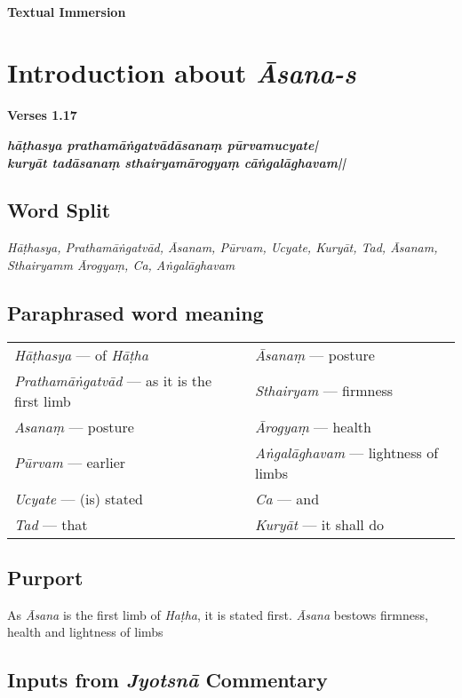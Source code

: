 \thispagestyle{empty}
~
\vfill
\begin{center}
\textbf{\Huge Textual Immersion}
\end{center}
\vfill
\eject

\section*{Introduction about \textit{Āsana-s}}


\noindent \textbf{Verses 1.17}

\begin{shloka}
\textit{\textbf{hāṭhasya prathamāṅgatvādāsanaṃ pūrvamucyate|}\\
\textbf{kuryāt tadāsanaṃ sthairyamārogyaṃ  cāṅgalāghavam||}}
\end{shloka}

\subsection*{Word Split}

\textit{Hāṭhasya, Prathamāṅgatvād, Āsanam, Pūrvam, Ucyate, Kuryāt, Tad, Āsanam, Sthairyamm Ārogyaṃ,  Ca, Aṅgalāghavam}

\subsection*{Paraphrased word meaning}

\begin{longtable}{>{\noindent\raggedright}p{5cm}>{\noindent\raggedright}p{5cm}}
\textit{Hāṭhasya} --- of \textit{Hāṭha} & \textit{Āsanaṃ} --- posture\tabularnewline
\textit{Prathamāṅgatvād} --- as it is the first limb & \textit{Sthairyam} --- firmness\tabularnewline
\textit{Asanaṃ} --- posture & \textit{Ārogyaṃ} --- health\tabularnewline
\textit{Pūrvam} --- earlier & \textit{Aṅgalāghavam} --- lightness of limbs\tabularnewline
\textit{Ucyate} --- (is) stated & \textit{Ca} --- and\tabularnewline
\textit{Tad} --- that & \textit{Kuryāt} --- it shall do
\end{longtable}


\subsection*{Purport}


As \textit{Āsana} is the first limb of \textit{Haṭha}, it is stated first. \textit{Āsana} bestows firmness, health and lightness of limbs

\subsection*{Inputs from \textit{Jyotsnā} Commentary}

